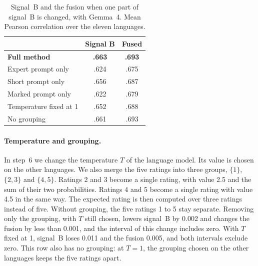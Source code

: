 \begin{table}[t]
\centering
\small
\setlength{\tabcolsep}{3pt}
\begin{tabular}{lcc}
\toprule
 & Signal B & Fused \\
\midrule
\textbf{Full method}          & \textbf{.663} & \textbf{.693} \\ %
\midrule
Expert prompt only            & .624 & .675 \\ %
Short prompt only             & .656 & .687 \\ %
Marked prompt only            & .622 & .679 \\ %
\midrule
Temperature fixed at 1        & .652 & .688 \\ %
No grouping                   & .661 & .693 \\ %
\bottomrule
\end{tabular}
\caption{Signal~B and the fusion when one part of signal~B is changed, with Gemma~4. Mean Pearson
correlation over the eleven languages.}
\label{tab:signal-b}
\end{table}

\paragraph{Temperature and grouping.} In step~6 we change the temperature $T$ of the language %
model. Its value is chosen on the other languages. We also merge the five ratings into three groups, %
$\{1\}$, $\{2, 3\}$ and $\{4, 5\}$. Ratings 2 and 3
become a single rating, with value 2.5 and the sum of their two probabilities. Ratings 4 and 5
become a single rating with value 4.5 in the same way. The expected rating is then computed over
three ratings instead of five. Without grouping, the five ratings 1 to 5 stay separate. Removing only the grouping, with $T$ still chosen, lowers signal~B by %
0.002 and changes the fusion by less than 0.001, and the interval of this change includes zero.
With $T$ fixed at 1, signal~B loses 0.011 and the fusion 0.005, and both intervals exclude zero. %
This row also has no grouping: at $T = 1$, the grouping chosen on the other languages keeps the %
five ratings apart.


